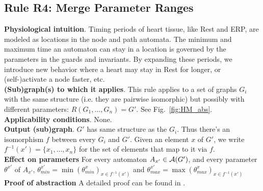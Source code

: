 %
%

\subsection{Rule R4: Merge Parameter Ranges}
\textbf{Physiological intuition}. 
Timing periods of heart tissue, like Rest and ERP, are modeled as locations in the node and path automata. 
The minimum and maximum time an automaton can stay in a location is governed by the parameters in the guards and invariants. 
By expanding these periods, we introduce new behavior where a heart may stay in Rest for longer, or (self-)activate a node faster, etc.
\\
\textbf{(Sub)graph(s) to which it applies}.
This rule applies to a set of graphs $G_i$ with the same structure (i.e. they are pairwise isomorphic) but possibly with different parameters: $R(G_1,\ldots,G_n) = G'$.
See Fig.~\ref{fig:HM_abs}.\\
\textbf{Applicability conditions}.
None.\\
\textbf{Output (sub)graph}.
$G'$ has same structure as the $G_i$.
Thus there's an isomorphism $f$ between every $G_i$ and $G'$.
Given an element $x$ of $G'$, we write $f^{-1}(x') = \{x_1,\dots,x_n\}$ for the set of elements that map to it via $f$.\\
\textbf{Effect on parameters}
For every automaton $A_{x'} \in \mathcal{A}(G')$, and every parameter $\theta^{x'}$ of $A_{x'}$, 
$\theta_{min}^{x'} = \min(\theta^x_{min})_{x \in f^{-1}(x') }$ and 
$\theta_{max}^{x'} = \max(\theta^x_{max})_{x \in f^{-1}(x') }$
\textbf{Proof of abstraction} A detailed proof can be found in \cite{regar_tech}.

%

